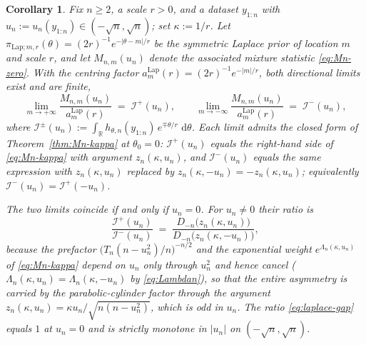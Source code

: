 \documentclass{article}%
\newtheorem{corollary}[theorem]{Corollary}
\newcommand{\R}{\mathbb{R}}
\newcommand{\dd}{\,\mathrm{d}}
\begin{document}
\begin{corollary}\label{cor:laplace-asymmetry}
Fix \(n\ge 2\), a scale \(r>0\), and a dataset \(y_{1:n}\) with
\(u_n:=u_n(y_{1:n})\in(-\sqrt n,\sqrt n)\); set \(\kappa:=1/r\). Let
\(\pi_{\mathrm{Lap};m,r}(\theta)=(2r)^{-1}e^{-|\theta-m|/r}\) be the
symmetric Laplace prior of location \(m\) and scale \(r\), and let
\(M_{n,m}(u_n)\) denote the associated mixture statistic \eqref{eq:Mn-zero}.
With the centring factor \(a_m^{\mathrm{Lap}}(r)=(2r)^{-1}e^{-|m|/r}\),
both directional limits exist and are finite,
\begin{equation}\label{eq:laplace-two-limits}
   \lim_{m\to+\infty}\frac{M_{n,m}(u_n)}{a_m^{\mathrm{Lap}}(r)}
   \;=\; \mathcal I^{+}(u_n),
   \qquad
   \lim_{m\to-\infty}\frac{M_{n,m}(u_n)}{a_m^{\mathrm{Lap}}(r)}
   \;=\; \mathcal I^{-}(u_n),
\end{equation}
where \(\mathcal I^{\pm}(u_n):=\int_\R h_{\theta,n}(y_{1:n})\,
e^{\mp\theta/r}\,\dd\theta\). Each limit admits the closed form of
Theorem~\ref{thm:Mn-kappa} at \(\theta_0=0\): \(\mathcal I^{+}(u_n)\)
equals the right-hand side of \eqref{eq:Mn-kappa} with argument
\(z_n(\kappa,u_n)\), and \(\mathcal I^{-}(u_n)\) equals the same
expression with \(z_n(\kappa,u_n)\) replaced by
\(z_n(\kappa,-u_n)=-z_n(\kappa,u_n)\); equivalently
\(\mathcal I^{-}(u_n)=\mathcal I^{+}(-u_n)\).

The two limits coincide if and only if \(u_n=0\). For \(u_n\neq 0\)
their ratio is
\begin{equation}\label{eq:laplace-gap}
   \frac{\mathcal I^{+}(u_n)}{\mathcal I^{-}(u_n)}
   \;=\;
   \frac{D_{-n}\!\big(z_n(\kappa,u_n)\big)}
        {D_{-n}\!\big(z_n(\kappa,-u_n)\big)} ,
\end{equation}
because the prefactor \(\big(T_n(n-u_n^2)/n\big)^{-n/2}\) and the
exponential weight \(e^{\Lambda_n(\kappa,u_n)}\) of \eqref{eq:Mn-kappa}
depend on \(u_n\) only through \(u_n^2\) and hence cancel
(\(\Lambda_n(\kappa,u_n)=\Lambda_n(\kappa,-u_n)\) by
\eqref{eq:Lambdan}), so that the entire asymmetry is carried by the
parabolic-cylinder factor through the argument
\(z_n(\kappa,u_n)=\kappa u_n/\sqrt{n(n-u_n^2)}\), which is odd in
\(u_n\). The ratio \eqref{eq:laplace-gap} equals \(1\) at \(u_n=0\)
and is strictly monotone in \(|u_n|\) on \((-\sqrt n,\sqrt n)\).
\end{corollary}
\end{document}

